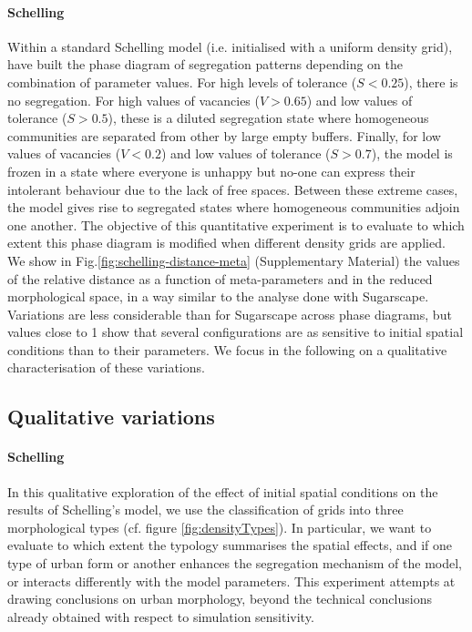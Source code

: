 \documentclass[preprint,5p,times,twocolumn,authoryear]{elsarticle}
\begin{document}
\paragraph{Schelling} 
Within a standard Schelling model (i.e. initialised with a uniform density grid), \citet{Gauvinetal2009} have built the phase diagram of segregation patterns depending on the combination of parameter values. For high levels of tolerance ($S < 0.25$), there is no segregation. For high values of vacancies ($V > 0.65$) and low values of tolerance ($S > 0.5$), these is a diluted segregation state where homogeneous communities are separated from other by large empty buffers. Finally, for low values of vacancies ($V < 0.2$) and low values of tolerance ($S > 0.7$), the model is frozen in a state where everyone is unhappy but no-one can express their intolerant behaviour due to the lack of free spaces. Between these extreme cases, the model gives rise to segregated states where homogeneous communities adjoin one another. The objective of this quantitative experiment is to evaluate to which extent this phase diagram is modified when different density grids are applied. We show in Fig.\ref{fig:schelling-distance-meta} (Supplementary Material) the values of the relative distance as a function of meta-parameters and in the reduced morphological space, in a way similar to the analyse done with Sugarscape. Variations are less considerable than for Sugarscape across phase diagrams, but values close to 1 show that several configurations are as sensitive to initial spatial conditions than to their parameters. We focus in the following on a qualitative characterisation of these variations.

\subsection{Qualitative variations}
\label{sec:qualResults}

\paragraph{Schelling}

In this qualitative exploration of the effect of initial spatial conditions on the results of Schelling's model, we use the classification of grids into three morphological types (cf. figure \ref{fig:densityTypes}). In particular, we want to evaluate to which extent the typology summarises the spatial effects, and if one type of urban form or another enhances the segregation mechanism of the model, or interacts differently with the model parameters. This experiment attempts at drawing conclusions on urban morphology, beyond the technical conclusions already obtained with respect to simulation sensitivity.
\end{document}
